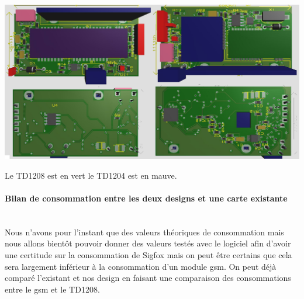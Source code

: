 \documentclass[10pt,a4paper]{article}
\begin{document}
\includegraphics[scale=0.2]{TP1204-1208.png} 

Le TD1208 est en vert le TD1204 est en mauve. 


\paragraph{Bilan de consommation entre les deux designs et une carte existante}\\
Nous n'avons pour l'instant que des valeurs théoriques de consommation mais nous allons bientôt pouvoir donner des valeurs testés avec le logiciel afin d'avoir une certitude sur la consommation de Sigfox mais on peut être certains que cela sera largement inférieur à la consommation d'un module gsm. On peut déjà comparé l'existant et nos design en faisant une comparaison des consommations entre le gsm et le TD1208.
\end{document}
